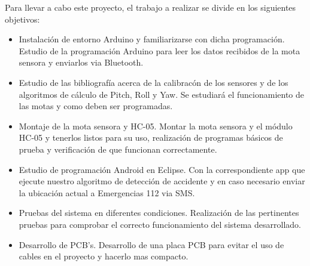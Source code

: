 		Para llevar a cabo este proyecto, el trabajo a realizar se divide en los siguientes objetivos:
		
		\begin{itemize}
			\item Instalaci\'on de entorno Arduino y familiarizarse con dicha programaci\'on. Estudio de la programaci\'on Arduino para leer los datos recibidos de la mota sensora y enviarlos via Bluetooth.
			
			\item Estudio de las bibliograf\'ia acerca de la calibrac\'on de los sensores y de los algoritmos de c\'alculo de Pitch, Roll y Yaw. Se estudiar\'a el funcionamiento de las motas y como deben ser programadas.
			
			\item Montaje de la mota sensora y HC-05. Montar la mota sensora y el m\'odulo HC-05 y tenerlos listos para su uso, realizaci\'on de programas b\'asicos de prueba y verificaci\'on de que funcionan correctamente.
			
			\item Estudio de programaci\'on Android en Eclipse. Con la correspondiente app que ejecute nuestro algoritmo de detecci\'on de accidente y en caso necesario enviar la ubicaci\'on actual a Emergencias 112 via SMS.
			
			\item Pruebas del sistema en diferentes condiciones. Realizaci\'on de las pertinentes pruebas para comprobar el correcto funcionamiento del sistema desarrollado.
			
			\item Desarrollo de PCB's. Desarrollo de una placa PCB para evitar el uso de cables en el proyecto y hacerlo mas compacto.
		\end{itemize}
		
		
	\newpage
	$\ $